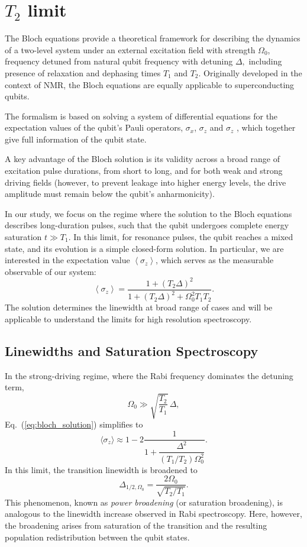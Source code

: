 \section{$T_2$ limit} \label{sec:T2_limit}

The Bloch equations \cite{PhysRev.70.460} provide a theoretical framework for describing the dynamics of a two-level system under an external excitation field with strength $\Omega_0$, frequency detuned from natural qubit frequency with detuning $\Delta,$ including presence of  relaxation and dephasing times $T_1$ and $T_2$. Originally developed in the context of NMR, the Bloch equations are equally applicable to superconducting qubits.

The formalism is based on solving a system of differential equations for the expectation values of the qubit's Pauli operators, $\sigma_x$, $\sigma_z$ and $\sigma_z$ , which together give full information of the qubit state. 

A key advantage of the Bloch solution is its validity across a broad range of excitation pulse durations, from short to long, and for both weak and strong driving fields (however, to prevent leakage into higher energy levels, the drive amplitude must remain below the qubit’s anharmonicity).

In our study, we focus on the regime where the solution to the Bloch equations describes long-duration pulses, such that the qubit undergoes complete energy saturation $t\gg T_1$. In this limit, for resonance pulses, the qubit reaches a mixed state, and its evolution is a simple closed-form solution. In particular, we are interested in the expectation value $\left<\sigma_z\right>$, which serves as the measurable observable of our system:
\begin{equation}
\left<\sigma_z\right> =\frac{1+(T_2\Delta)^2}{1+(T_2\Delta)^2+\Omega_0^2T_1T_2}
\label{eq:bloch_solution}
.\end{equation}
The solution determines the linewidth at broad range of cases and will be applicable to understand the limits for high resolution spectroscopy.

\subsection{Linewidths and Saturation Spectroscopy}

In the strong-driving regime, where the Rabi frequency dominates the detuning term,
\[
\Omega_0 \gg \sqrt{\frac{T_2}{T_1}}\,\Delta,
\]
Eq.~(\ref{eq:bloch_solution}) simplifies to
\begin{equation}
    \langle \sigma_z \rangle
    \approx
    1 - 2\frac{1}{1 + \dfrac{\Delta^2}{(T_1/T_2)\Omega_0^2}}.
\end{equation}
In this limit, the transition linewidth is broadened to
\begin{equation}
    \Delta_{1/2,\Omega_0}
    =
    \frac{2\Omega_0}{\sqrt{T_2/T_1}}.
\end{equation}
This phenomenon, known as \emph{power broadening} (or saturation broadening), is analogous to the linewidth increase observed in Rabi spectroscopy. Here, however, the broadening arises from saturation of the transition and the resulting population redistribution between the qubit states.

